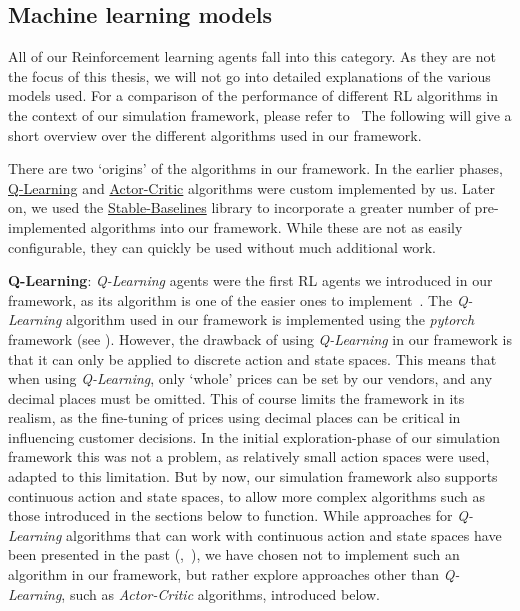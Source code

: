 \subsection{Machine learning models}\label{subsec:MachineLearningModels}

All of our Reinforcement learning agents fall into this category. As they are not the focus of this thesis, we will not go into detailed explanations of the various models used. For a comparison of the performance of different RL algorithms in the context of our simulation framework, please refer to~\cite{JanThesis} The following will give a short overview over the different algorithms used in our framework.

There are two `origins' of the algorithms in our framework. In the earlier phases, \hyperref[item:QLearning]{Q-Learning} and \hyperref[item:ActorCritic]{Actor-Critic} algorithms were custom implemented by us. Later on, we used the \hyperref[item:StableBaselines]{Stable-Baselines} library to incorporate a greater number of pre-implemented algorithms into our framework. While these are not as easily configurable, they can quickly be used without much additional work.

\medskip
\noindent\textbf{Q-Learning}:\label{item:QLearning} \emph{Q-Learning} agents were the first RL agents we introduced in our framework, as its algorithm is one of the easier ones to implement~\cite{reinforcementLearningOverview}. The \emph{Q-Learning} algorithm used in our framework is implemented using the \emph{pytorch} framework (see \cite{Pytorch}). However, the drawback of using \emph{Q-Learning} in our framework is that it can only be applied to discrete action and state spaces. This means that when using \emph{Q-Learning}, only `whole' prices can be set by our vendors, and any decimal places must be omitted. This of course limits the framework in its realism, as the fine-tuning of prices using decimal places can be critical in influencing customer decisions. In the initial exploration-phase of our simulation framework this was not a problem, as relatively small action spaces were used, adapted to this limitation. But by now, our simulation framework also supports continuous action and state spaces, to allow more complex algorithms such as those introduced in the sections below to function. While approaches for \emph{Q-Learning} algorithms that can work with continuous action and state spaces have been presented in the past (\cite{QLearningContinuous},~\cite{QLearningContinuous2}), we have chosen not to implement such an algorithm in our framework, but rather explore approaches other than \emph{Q-Learning}, such as \emph{Actor-Critic} algorithms, introduced below.

